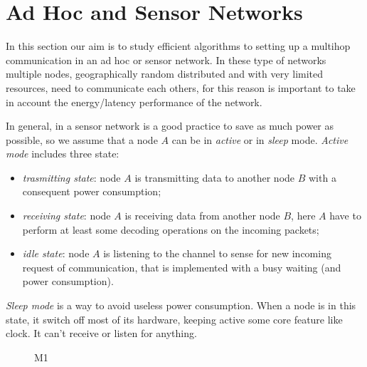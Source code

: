 \chapter{Ad Hoc and Sensor Networks}
In this section our aim is to study efficient algorithms to setting up a multihop communication in an ad hoc or sensor network.
In these type of networks multiple nodes, geographically random distributed and with very limited resources, need to communicate each others, for this reason is important to take in account the energy/latency performance of the network.

In general, in a sensor network is a good practice to save as much power as possible, so we assume that a node $A$ can be in \textit{active} or in \textit{sleep} mode.
\textit{Active mode} includes three state:
\begin{itemize}
	\item \textit{trasmitting state}: node $A$ is transmitting data to another node $B$ with a consequent power consumption;
	\item \textit{receiving state}: node $A$ is receiving data from another node $B$, here $A$ have to perform at least some decoding operations on the incoming packets;
	\item \textit{idle state}: node $A$ is listening to the channel to sense for new incoming request of communication, that is implemented with a busy waiting (and power consumption).
\end{itemize}

\textit{Sleep mode} is a way to avoid useless power consumption. When a node is in this state, it switch off most of its hardware, keeping active some core feature like clock. It can't receive or listen for anything.
\begin{figure}[h]
\centering
{}
\caption{M1} \label{fig:powervar}
\end{figure}


